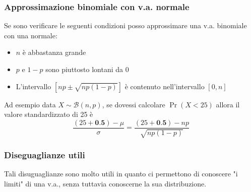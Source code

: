 \subsubsection*{Approssimazione binomiale con v.a. normale}
Se sono verificare le seguenti condizioni posso approssimare una v.a. binomiale con una normale:
\begin{itemize}
	\item $ n $ è abbastanza grande
	\item $ p $ e $ 1-p $ sono piuttosto lontani da 0
	\item L'intervallo $ \left[np \pm \sqrt{np\left(1-p\right)}\right] $ è contenuto nell'intervallo $ \left[0,n\right] $
\end{itemize}
Ad esempio data $ X \sim \mathcal{B}\left(n, p\right) $, se dovessi calcolare $ \Pr \left(X < 25\right) $ allora il valore standardizzato di 25 è
\[
	\frac{\left(25 + \textbf{0.5}\right) - \mu }{ \sigma } =  \frac{\left(25 + \textbf{0.5}\right) - np}{\sqrt{np\left(1-p\right)}}
\]
\subsubsection*{Diseguaglianze utili}
Tali disuguaglianze sono molto utili in quanto ci permettono di conoscere "i limiti" di una v.a., senza tuttavia conoscerne la sua distribuzione.
